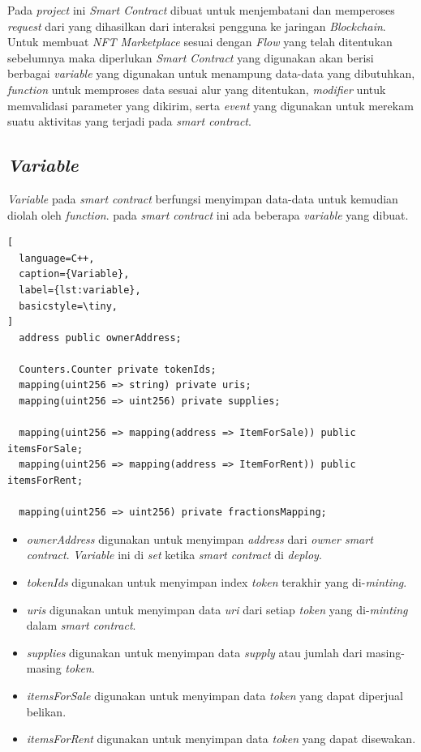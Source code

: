 Pada \emph{project} ini \emph{Smart Contract} dibuat untuk menjembatani dan memperoses \emph{request} dari yang dihasilkan dari interaksi pengguna ke jaringan \emph{Blockchain}. Untuk membuat \emph{NFT Marketplace} sesuai dengan \emph{Flow} yang telah ditentukan sebelumnya maka diperlukan \emph{Smart Contract} yang digunakan akan berisi berbagai \emph{variable} yang digunakan untuk menampung data-data yang dibutuhkan, \emph{function} untuk memproses data sesuai alur yang ditentukan, \emph{modifier} untuk memvalidasi parameter yang dikirim, serta \emph{event} yang digunakan untuk merekam suatu aktivitas yang terjadi pada \emph{smart contract}. 

\subsection{\emph{Variable}}

\emph{Variable} pada \emph{smart contract} berfungsi menyimpan data-data untuk kemudian diolah oleh \emph{function}. pada \emph{smart contract} ini ada beberapa \emph{variable} yang dibuat.

\begin{lstlisting}[
  language=C++,
  caption={Variable},
  label={lst:variable},
  basicstyle=\tiny,
]
  address public ownerAddress;

  Counters.Counter private tokenIds;
  mapping(uint256 => string) private uris;
  mapping(uint256 => uint256) private supplies;
  
  mapping(uint256 => mapping(address => ItemForSale)) public itemsForSale;
  mapping(uint256 => mapping(address => ItemForRent)) public itemsForRent;
  
  mapping(uint256 => uint256) private fractionsMapping;
\end{lstlisting}

\begin{itemize}
  \item \emph{ownerAddress} digunakan untuk menyimpan \emph{address} dari \emph{owner smart contract}. \emph{Variable} ini di \emph{set} ketika \emph{smart contract} di \emph{deploy}.
  \item \emph{tokenIds} digunakan untuk menyimpan index \emph{token} terakhir yang di-\emph{minting}.
  \item \emph{uris} digunakan untuk menyimpan data \emph{uri} dari setiap \emph{token} yang di-\emph{minting} dalam \emph{smart contract}. 
  \item \emph{supplies} digunakan untuk menyimpan data \emph{supply} atau jumlah dari masing-masing \emph{token}.
  \item \emph{itemsForSale} digunakan untuk menyimpan data \emph{token} yang dapat diperjual belikan.
  \item \emph{itemsForRent} digunakan untuk menyimpan data \emph{token} yang dapat disewakan.
\end{itemize}

